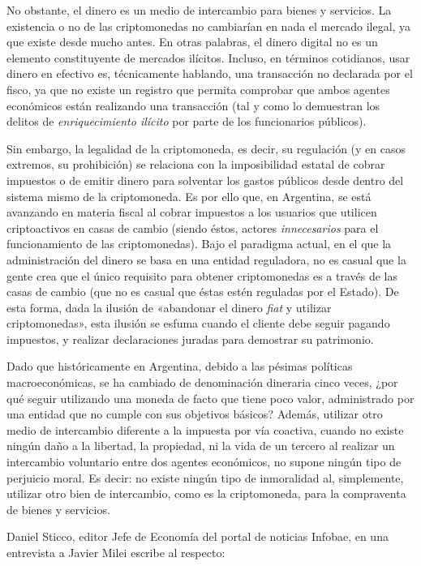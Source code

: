 \documentclass[12pt,a4paper,twoside]{book}
\begin{document}
No obstante, el dinero es un medio de intercambio para bienes y servicios. La existencia o no de las criptomonedas no cambiarían en nada el mercado ilegal, ya que existe desde mucho antes. En otras palabras, el dinero digital no es un elemento constituyente de mercados ilícitos. Incluso, en términos cotidianos, usar dinero en efectivo es, técnicamente hablando, una transacción no declarada por el fisco, ya que no existe un registro que permita comprobar que ambos agentes económicos están realizando una transacción (tal y como lo demuestran los delitos de \textit{enriquecimiento ilícito} por parte de los funcionarios públicos).

Sin embargo, la legalidad de la criptomoneda, es decir, su regulación (y en casos extremos, su prohibición) se relaciona con la imposibilidad estatal de cobrar impuestos o de emitir dinero para solventar los gastos públicos desde dentro del sistema mismo de la criptomoneda. Es por ello que, en Argentina, se está avanzando en materia fiscal al cobrar impuestos a los usuarios que utilicen criptoactivos en casas de cambio (siendo éstos, actores \textit{innecesarios} para el funcionamiento de las criptomonedas). Bajo el paradigma actual, en el que la administración del dinero se basa en una entidad reguladora, no es casual que la gente crea que el único requisito para obtener criptomonedas es a través de las casas de cambio (que no es casual que éstas estén reguladas por el Estado). De esta forma, dada la ilusión de «abandonar el dinero \textit{fiat} y utilizar criptomonedas», esta ilusión se esfuma cuando el cliente debe seguir pagando impuestos, y realizar declaraciones juradas para demostrar su patrimonio.

Dado que históricamente en Argentina, debido a las pésimas políticas macroeconómicas, se ha cambiado de denominación dineraria cinco veces, ¿por qué seguir utilizando una moneda de facto que tiene poco valor, administrado por una entidad que no cumple con sus objetivos básicos? Además, utilizar otro medio de intercambio diferente a la impuesta por vía coactiva, cuando no existe ningún daño a la libertad, la propiedad, ni la vida de un tercero al realizar un intercambio voluntario entre dos agentes económicos, no supone ningún tipo de perjuicio moral. Es decir: no existe ningún tipo de inmoralidad al, simplemente, utilizar otro bien de intercambio, como es la criptomoneda, para la compraventa de bienes y servicios.

Daniel Sticco, editor Jefe de Economía del portal de noticias Infobae, en una entrevista a Javier Milei escribe al respecto:
\end{document}
